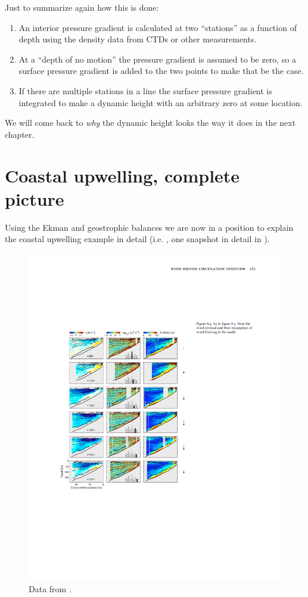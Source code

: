 Just to summarize again how this is done:
\begin{enumerate}
    \item An interior pressure gradient is calculated at two ``stations'' as a function of depth using the density data from CTDs or other measurements.
    \item At a ``depth of no motion'' the pressure gradient is assumed to be zero, so a surface pressure gradient is added to the two points to make that be the case.
    \item If there are multiple stations in a line the surface pressure gradient is integrated to make a dynamic height with an arbitrary zero at some location. 
\end{enumerate}
 
We will come back to \emph{why} the dynamic height looks the way it does in the next chapter.

\section{Coastal upwelling, complete picture}

Using the Ekman and geostrophic balances we are now in a position to explain the coastal upwelling example in detail (i.e. , one snapshot in detail in ). 

\begin{figure}[hbt]
  \begin{center}
    \includegraphics{figs/Geostrophic/ShelfDetail}
    \caption{Data from .}
    \label{fig:ShelfDetail}  
  \end{center}
\end{figure}

